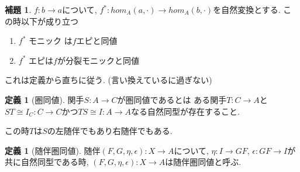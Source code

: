 \documentclass[dvipdfmx,a4paper,11pt]{article}
\theoremstyle{definition}
\newtheorem{lem}[thm]{補題}
\newtheorem{dfn}[thm]{定義}
\begin{document}
 \begin{tcolorbox}
 [colback = white, colframe = green!35!black, fonttitle = \bfseries,breakable = true]
\begin{lem}
$f: b \to a$について, $f^{*} : hom_{A} (a, \cdot) \to hom_{A}(b, \cdot)$を自然変換とする. 
この時以下が成り立つ
\begin{enumerate}
\item $f^{*}$ モニック は$f$エピと同値
\item $f^{*}$ エピは$f$が分裂モニックと同値
\end{enumerate}
\end{lem}
\end{tcolorbox}
これは定義から直ちに従う. (言い換えているに過ぎない)

 \begin{tcolorbox}
 [colback = white, colframe = green!35!black, fonttitle = \bfseries,breakable = true]
\begin{dfn}[圏同値]
関手$S : A \to C$が圏同値であるとは
ある関手$T : C \to A$と$ST \cong I_{C} : C \to C$かつ$TS \cong I : A \to A$なる自然同型が存在すること.

この時$T$は$S$の左随伴でもあり右随伴でもある. 
\end{dfn}
\end{tcolorbox}

 \begin{tcolorbox}
 [colback = white, colframe = green!35!black, fonttitle = \bfseries,breakable = true]
\begin{dfn}[随伴圏同値]
随伴$(F,G,\eta,\epsilon): X \to A$について, $\eta : I \to GF$, $\epsilon : GF \to I$が共に自然同型である時, 
$(F,G,\eta,\epsilon): X \to A$は随伴圏同値と呼ぶ. 
\end{dfn}
\end{tcolorbox}
\end{document}
